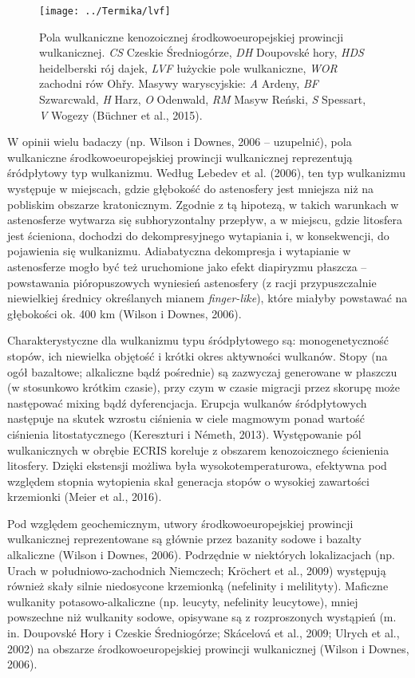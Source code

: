 \documentclass[11.5pt,twoside]{report}
\begin{document}
\begin{figure}[h]
	\centering
	\texttt{[image: ../Termika/lvf]}
	\caption{Pola wulkaniczne kenozoicznej środkowoeuropejskiej prowincji wulkanicznej. \textit{CS} Czeskie Średniogórze, \textit{DH} Doupovsk\'{e} hory, \textit{HDS} heidelberski rój dajek, \textit{LVF} łużyckie pole wulkaniczne, \textit{WOR} zachodni rów Oh\v{r}y. Masywy waryscyjskie: \textit{A} Ardeny, \textit{BF} Szwarcwald, \textit{H} Harz, \textit{O} Odenwald, \textit{RM} Masyw Reński, \textit{S} Spessart, \textit{V} Wogezy (B\"{u}chner et al., 2015).} 
	\label{Fig.}
\end{figure}

W opinii wielu badaczy (np. Wilson i Downes, 2006 -- uzupelnić), pola wulkaniczne środkowoeuropejskiej prowincji wulkanicznej reprezentują śródpłytowy typ wulkanizmu. Według Lebedev et al. (2006), ten typ wulkanizmu występuje w miejscach, gdzie głębokość do astenosfery jest mniejsza niż na pobliskim obszarze kratonicznym. Zgodnie z tą hipotezą, w takich warunkach w astenosferze wytwarza się subhoryzontalny przepływ, a w miejscu, gdzie litosfera jest ścieniona, dochodzi do dekompresyjnego wytapiania i, w konsekwencji, do pojawienia się wulkanizmu. Adiabatyczna dekompresja i wytapianie w astenosferze mogło być też uruchomione jako efekt diapiryzmu płaszcza -- powstawania pióropuszowych wyniesień astenosfery (z racji przypuszczalnie niewielkiej średnicy określanych mianem \textit{finger-like}), które miałyby powstawać na głębokości ok. 400 km (Wilson i Downes, 2006). 

Charakterystyczne dla wulkanizmu typu śródpłytowego są: monogenetyczność stopów, ich niewielka objętość i krótki okres aktywności wulkanów. Stopy (na ogół bazaltowe; alkaliczne bąd\'{z} pośrednie) są zazwyczaj generowane w płaszczu (w stosunkowo krótkim czasie), przy czym w czasie migracji przez skorupę może następować mixing bąd\'{z} dyferencjacja. Erupcja wulkanów śródpłytowych następuje na skutek wzrostu ciśnienia w ciele magmowym ponad wartość ciśnienia litostatycznego (Kereszturi i Németh, 2013). Występowanie pól wulkanicznych w obrębie ECRIS koreluje z obszarem kenozoicznego ścienienia litosfery. Dzięki ekstensji możliwa była wysokotemperaturowa, efektywna pod względem stopnia wytopienia skał generacja stopów o wysokiej zawartości krzemionki (Meier et al., 2016).

Pod względem geochemicznym, utwory środkowoeuropejskiej prowincji wulkanicznej reprezentowane są głównie przez bazanity sodowe i bazalty alkaliczne (Wilson i Downes, 2006). Podrzędnie w niektórych lokalizacjach (np. Urach w południowo-zachodnich Niemczech; Kröchert et al., 2009) występują również skały silnie niedosycone krzemionką (nefelinity i melilityty). Maficzne wulkanity potasowo-alkaliczne (np. leucyty, nefelinity leucytowe), mniej powszechne niż wulkanity sodowe, opisywane są z rozproszonych wystąpień (m. in. Doupovsk\'{e} Hory i Czeskie Średniogórze; Skácelová et al., 2009; Ulrych et al., 2002) na obszarze środkowoeuropejskiej prowincji wulkanicznej (Wilson i Downes, 2006).
\end{document}
